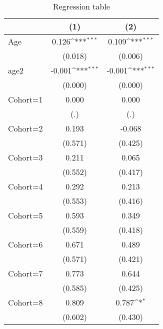 \begin{table}[htbp]\centering
\def\sym#1{\ifmmode^{#1}\else\(^{#1}\)\fi}
\caption{Regression table \label{reg1}}
\begin{tabular}{l*{2}{c}}
\toprule
                    &\multicolumn{1}{c}{(1)}         &\multicolumn{1}{c}{(2)}         \\
\midrule
Age                 &       0.126\sym{***}&       0.109\sym{***}\\
                    &     (0.018)         &     (0.006)         \\
\addlinespace
age2                &      -0.001\sym{***}&      -0.001\sym{***}\\
                    &     (0.000)         &     (0.000)         \\
\addlinespace
Cohort=1            &       0.000         &       0.000         \\
                    &         (.)         &         (.)         \\
\addlinespace
Cohort=2            &       0.193         &      -0.068         \\
                    &     (0.571)         &     (0.425)         \\
\addlinespace
Cohort=3            &       0.211         &       0.065         \\
                    &     (0.552)         &     (0.417)         \\
\addlinespace
Cohort=4            &       0.292         &       0.213         \\
                    &     (0.553)         &     (0.416)         \\
\addlinespace
Cohort=5            &       0.593         &       0.349         \\
                    &     (0.559)         &     (0.418)         \\
\addlinespace
Cohort=6            &       0.671         &       0.489         \\
                    &     (0.571)         &     (0.421)         \\
\addlinespace
Cohort=7            &       0.773         &       0.644         \\
                    &     (0.585)         &     (0.425)         \\
\addlinespace
Cohort=8            &       0.809         &       0.787\sym{*}  \\
                    &     (0.602)         &     (0.430)         \\

\end{tabular}
\end{table}
